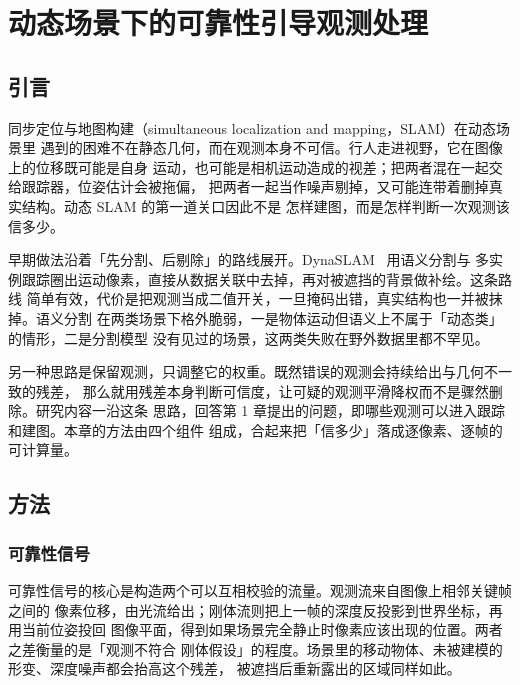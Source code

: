%

\chapter{动态场景下的可靠性引导观测处理}
\label{ch:study1}

\section{引言}

同步定位与地图构建（simultaneous localization and mapping，SLAM）在动态场景里
遇到的困难不在静态几何，而在观测本身不可信。行人走进视野，它在图像上的位移既可能是自身
运动，也可能是相机运动造成的视差；把两者混在一起交给跟踪器，位姿估计会被拖偏，
把两者一起当作噪声剔掉，又可能连带着删掉真实结构。动态 SLAM 的第一道关口因此不是
怎样建图，而是怎样判断一次观测该信多少。

早期做法沿着「先分割、后剔除」的路线展开。DynaSLAM~\cite{DynaSLAM} 用语义分割与
多实例跟踪圈出运动像素，直接从数据关联中去掉，再对被遮挡的背景做补绘。这条路线
简单有效，代价是把观测当成二值开关，一旦掩码出错，真实结构也一并被抹掉。语义分割
在两类场景下格外脆弱，一是物体运动但语义上不属于「动态类」的情形，二是分割模型
没有见过的场景，这两类失败在野外数据里都不罕见。

另一种思路是保留观测，只调整它的权重。既然错误的观测会持续给出与几何不一致的残差，
那么就用残差本身判断可信度，让可疑的观测平滑降权而不是骤然删除。研究内容一沿这条
思路，回答第 1 章提出的问题，即哪些观测可以进入跟踪和建图。本章的方法由四个组件
组成，合起来把「信多少」落成逐像素、逐帧的可计算量。

\section{方法}
\label{sec:study1-method}

\subsection{可靠性信号}

可靠性信号的核心是构造两个可以互相校验的流量。观测流来自图像上相邻关键帧之间的
像素位移，由光流给出；刚体流则把上一帧的深度反投影到世界坐标，再用当前位姿投回
图像平面，得到如果场景完全静止时像素应该出现的位置。两者之差衡量的是「观测不符合
刚体假设」的程度。场景里的移动物体、未被建模的形变、深度噪声都会抬高这个残差，
被遮挡后重新露出的区域同样如此。

